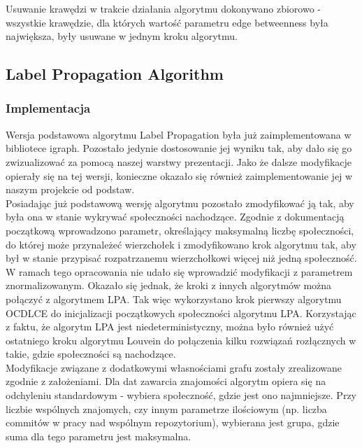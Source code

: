 \documentclass{article}
\begin{document}
Usuwanie krawędzi w trakcie działania algorytmu dokonywano zbiorowo - wszystkie krawędzie, dla których wartość parametru edge betweenness była największa, były usuwane w jednym kroku algorytmu.\\

\subsection{Label Propagation Algorithm}
\subsubsection{Implementacja}

Wersja podstawowa algorytmu Label Propagation była już zaimplementowana w bibliotece igraph. Pozostało jedynie dostosowanie jej wyniku tak, aby dało się go zwizualizować za pomocą naszej warstwy prezentacji. Jako że dalsze modyfikacje opierały się na tej wersji, konieczne okazało się również zaimplementowanie jej w naszym projekcie od podstaw.\\

Posiadając już podstawową wersję algorytmu pozostało zmodyfikować ją tak, aby była ona w stanie wykrywać społeczności nachodzące. Zgodnie z dokumentacją początkową wprowadzono parametr, określający maksymalną liczbę społeczności, do której może przynależeć wierzchołek i zmodyfikowano krok algorytmu tak, aby był w stanie przypisać rozpatrzanemu wierzchołkowi więcej niż jedną społeczność.\\

W ramach tego opracowania nie udało się wprowadzić modyfikacji z parametrem znormalizowanym. Okazało się jednak, że kroki z innych algorytmów można połączyć z algorytmem LPA. Tak więc wykorzystano krok pierwszy algorytmu OCDLCE do inicjalizacji początkowych społeczności algorytmu LPA. Korzystając z faktu, że algorytm LPA jest niedeterministyczny, można było również użyć ostatniego kroku algorytmu Louvein do połączenia kilku rozwiązań rozłącznych w takie, gdzie społeczności są nachodzące.\\

Modyfikacje związane z dodatkowymi własnościami grafu zostały zrealizowane zgodnie z założeniami. Dla dat zawarcia znajomości algorytm opiera się na odchyleniu standardowym - wybiera społeczność, gdzie jest ono najmniejsze. Przy liczbie wspólnych znajomych, czy innym parametrze ilościowym (np. liczba commitów w pracy nad wspólnym repozytorium), wybierana jest grupa, gdzie suma dla tego parametru jest maksymalna.
\end{document}
